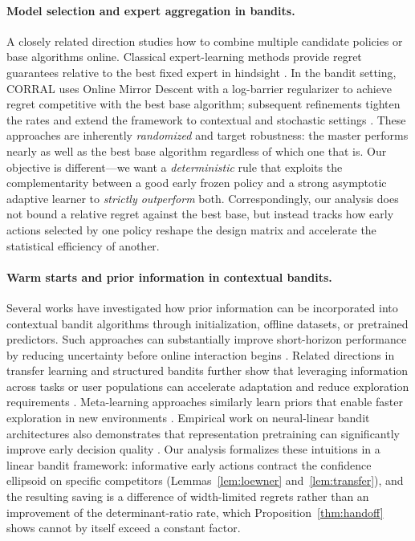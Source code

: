 \documentclass[anon]{alt2027} %
\begin{document}
\paragraph{Model selection and expert aggregation in bandits.}
A closely related direction studies how to combine multiple candidate
policies or base algorithms online. Classical expert-learning methods provide
regret guarantees relative to the best fixed expert in hindsight
\citep{auer2002nonstochastic}. In the bandit setting, CORRAL
\citep{agarwal2017corralling} uses Online Mirror Descent with a log-barrier
regularizer to achieve regret competitive with the best base algorithm;
subsequent refinements tighten the rates and extend the framework to
contextual and stochastic settings
\citep{pacchiano2020model,marinov2021pareto,zhu2022pareto,zhu2022near,
dann2024data}. These approaches are inherently \emph{randomized} and target
robustness: the master performs nearly as well as the best base algorithm
regardless of which one that is. Our objective is different---we want a
\emph{deterministic} rule that exploits the complementarity between a good
early frozen policy and a strong asymptotic adaptive learner to
\emph{strictly outperform} both. Correspondingly, our analysis does not
bound a relative regret against the best base, but instead tracks how early
actions selected by one policy reshape the design matrix and accelerate the
statistical efficiency of another.

\paragraph{Warm starts and prior information in contextual bandits.}
Several works have investigated how prior information can be incorporated
into contextual bandit algorithms through initialization, offline datasets,
or pretrained predictors. Such approaches can substantially improve
short-horizon performance by reducing uncertainty before online interaction
begins \citep{bastani2021mostly,zhang2019warm}. Related directions in
transfer learning and structured bandits further show that leveraging
information across tasks or user populations can accelerate adaptation and
reduce exploration requirements \citep{lazaric2012transfer,gentile2014online}.
Meta-learning approaches similarly learn priors that enable faster
exploration in new environments \citep{sharaf2019meta}. Empirical work on
neural-linear bandit architectures also demonstrates that representation
pretraining can significantly improve early decision quality
\citep{riquelme2018deep}. Our analysis formalizes these intuitions in a
linear bandit framework: informative early actions contract the confidence
ellipsoid on specific competitors (Lemmas~\ref{lem:loewner}
and~\ref{lem:transfer}), and the resulting saving is a difference of
width-limited regrets rather than an improvement of the
determinant-ratio rate, which Proposition~\ref{thm:handoff} shows cannot by
itself exceed a constant factor.
\end{document}
